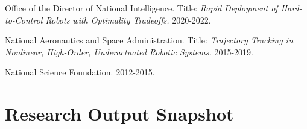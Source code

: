 \documentclass[letterpaper]{deedy-resume} %
\newcommand\Tstrut{\rule{0pt}{2.6ex}}         %
\begin{document}
{\begin{etaremune}[itemsep=0.05cm]
\item {{} Office of the Director of National Intelligence. Title: {\it Rapid Deployment of Hard-to-Control Robots with Optimality Tradeoffs.} 2020-2022.}

\item {{} National Aeronautics and Space Administration. Title: {\it Trajectory Tracking in Nonlinear, High-Order, Underactuated Robotic Systems.} 2015-2019.}
  


\item {{} National Science Foundation. 2012-2015.}

\end{etaremune}


\vspace{0.2cm}
\section{Research Output Snapshot}
 

}
\end{document}
